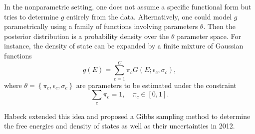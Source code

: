 In the nonparametric setting, one does not assume a specific functional form but tries to determine $g$ entirely from the data. Alternatively, one could model $g$ parametrically using a family of functions involving parameters $\theta$. Then the posterior distribution is a probability density over the $\theta$ parameter space. For instance, the density of state can be expanded by a finite mixture of Gaussian functions 
\begin{equation}
    g(E)=\sum\limits_{c=1}^C \pi_c G(E;\epsilon_c,\sigma_c),
\end{equation}
where $\theta=\left\{\pi_c,\epsilon_c,\sigma_c\right\}$ are parameters to be estimated under the constraint
\begin{equation}
    \sum_c\pi_c=1,\quad \pi_c\in [0,1].
\end{equation}

Habeck extended this idea and proposed a Gibbs sampling method to determine the free energies and density of states as well as their uncertainties in 2012.\cite{HabeckPRL2012}

